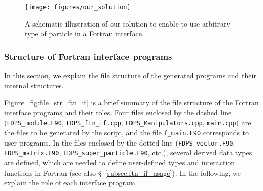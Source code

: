 \documentclass[proof,useamsfonts]{pasj01}
\begin{document}
\begin{figure}[h]
\begin{center}
\texttt{[image: figures/our\_solution]}
\end{center}
\caption{A schematic illustration of our solution to enable to use arbitrary type of particle in a Fortran interface.}
\label{fig:our_solution}  
\end{figure}

\subsubsection{Structure of Fortran interface programs}
\label{subsubsec:ftn_if_str}
In this section, we explain the file structure of the generated programs and their internal structures.

Figure~\ref{fig:file_str_ftn_if} is a brief summary of the file structure of the Fortran interface programs and their roles. Four files enclosed by the dashed line (\texttt{FDPS\_module.F90}, \texttt{FDPS\_ftn\_if.cpp}, \texttt{FDPS\_Manipulators.cpp}, \texttt{main.cpp}) are the files to be generated by the script, and the file \texttt{f\_main.F90} corresponds to user programs. In the files enclosed by the dotted line (\texttt{FDPS\_vector.F90}, \texttt{FDPS\_matrix.F90}, \texttt{FDPS\_super\_particle.F90}, etc.), several derived data types are defined, which are needed to define user-defined types and interaction functions in Fortran (see also \S~\ref{subsec:ftn_if_usage}). In the following, we explain the role of each interface program.
\end{document}
